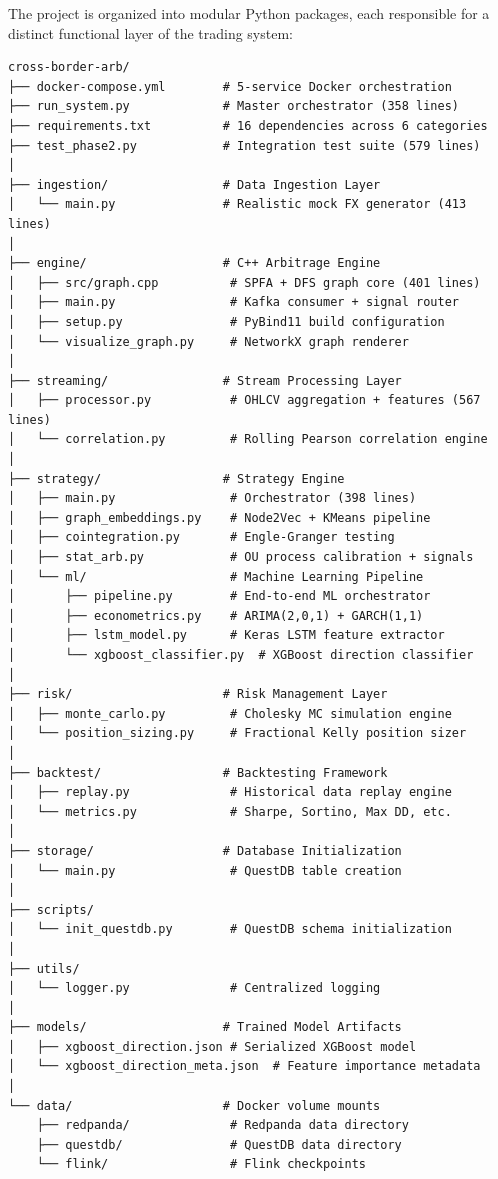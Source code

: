 \documentclass[letterpaper,11pt]{report}
\begin{document}
The project is organized into modular Python packages, each responsible for a distinct functional layer of the trading system:

\begin{verbatim}
cross-border-arb/
├── docker-compose.yml        # 5-service Docker orchestration
├── run_system.py             # Master orchestrator (358 lines)
├── requirements.txt          # 16 dependencies across 6 categories
├── test_phase2.py            # Integration test suite (579 lines)
│
├── ingestion/                # Data Ingestion Layer
│   └── main.py               # Realistic mock FX generator (413 lines)
│
├── engine/                   # C++ Arbitrage Engine
│   ├── src/graph.cpp          # SPFA + DFS graph core (401 lines)
│   ├── main.py                # Kafka consumer + signal router
│   ├── setup.py               # PyBind11 build configuration
│   └── visualize_graph.py     # NetworkX graph renderer
│
├── streaming/                # Stream Processing Layer
│   ├── processor.py           # OHLCV aggregation + features (567 lines)
│   └── correlation.py         # Rolling Pearson correlation engine
│
├── strategy/                 # Strategy Engine
│   ├── main.py                # Orchestrator (398 lines)
│   ├── graph_embeddings.py    # Node2Vec + KMeans pipeline
│   ├── cointegration.py       # Engle-Granger testing
│   ├── stat_arb.py            # OU process calibration + signals
│   └── ml/                    # Machine Learning Pipeline
│       ├── pipeline.py        # End-to-end ML orchestrator
│       ├── econometrics.py    # ARIMA(2,0,1) + GARCH(1,1)
│       ├── lstm_model.py      # Keras LSTM feature extractor
│       └── xgboost_classifier.py  # XGBoost direction classifier
│
├── risk/                     # Risk Management Layer
│   ├── monte_carlo.py         # Cholesky MC simulation engine
│   └── position_sizing.py     # Fractional Kelly position sizer
│
├── backtest/                 # Backtesting Framework
│   ├── replay.py              # Historical data replay engine
│   └── metrics.py             # Sharpe, Sortino, Max DD, etc.
│
├── storage/                  # Database Initialization
│   └── main.py                # QuestDB table creation
│
├── scripts/
│   └── init_questdb.py        # QuestDB schema initialization
│
├── utils/
│   └── logger.py              # Centralized logging
│
├── models/                   # Trained Model Artifacts
│   ├── xgboost_direction.json # Serialized XGBoost model
│   └── xgboost_direction_meta.json  # Feature importance metadata
│
└── data/                     # Docker volume mounts
    ├── redpanda/              # Redpanda data directory
    ├── questdb/               # QuestDB data directory
    └── flink/                 # Flink checkpoints
\end{verbatim}
\end{document}
